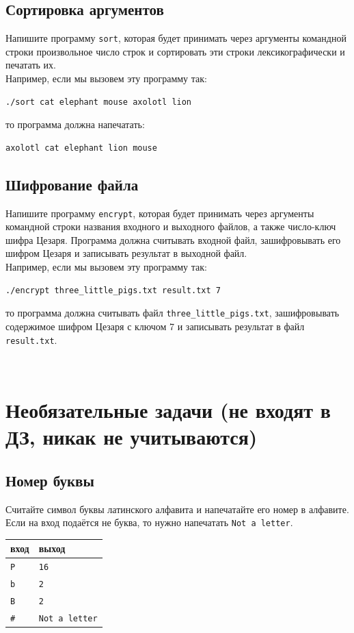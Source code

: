 \documentclass{article}
\begin{document}
\subsection{Сортировка аргументов}
Напишите программу \texttt{sort}, которая будет принимать через аргументы командной строки произвольное число строк и сортировать эти строки лексикографически и печатать их.\\
Например, если мы вызовем эту программу так:
\begin{verbatim}
./sort cat elephant mouse axolotl lion
\end{verbatim}
то программа должна напечатать:
\begin{verbatim}
axolotl cat elephant lion mouse
\end{verbatim}


\subsection{Шифрование файла}
Напишите программу \texttt{encrypt}, которая будет принимать через аргументы командной строки названия входного и выходного файлов, а также число-ключ шифра Цезаря. Программа должна считывать входной файл, зашифровывать его шифром Цезаря и записывать результат в выходной файл.\\
Например, если мы вызовем эту программу так:
\begin{verbatim}
./encrypt three_little_pigs.txt result.txt 7
\end{verbatim}
то программа должна считывать файл \texttt{three\_little\_pigs.txt}, зашифровывать содержимое шифром Цезаря с ключом 7 и записывать результат в файл \texttt{result.txt}.







\newpage
~
\newpage
\section*{Необязательные задачи (не входят в ДЗ, никак не учитываются)}
\setcounter{subsection}{0}

\subsection{Номер буквы}
Считайте символ буквы латинского алфавита и напечатайте его номер в алфавите. Если на вход подаётся не буква, то нужно напечатать \texttt{Not a letter}.
\begin{center}
\begin{tabular}{ l | l }
 вход & выход \\ \hline
 \texttt{P} & \texttt{16} \\
 \texttt{b} & \texttt{2} \\
 \texttt{B} & \texttt{2} \\
 \texttt{\#} & \texttt{Not a letter}\\ 
\end{tabular}
\end{center}
\end{document}
